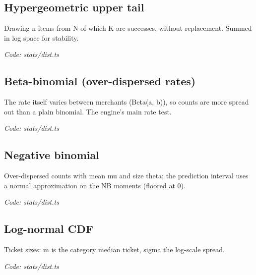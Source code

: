 \documentclass[11pt,a4paper]{article}
\newcommand{\where}[1]{\par{\small\itshape\color{mute}Code: #1}\par}
\begin{document}
\subsection*{Hypergeometric upper tail}
\par\smallskip\noindent{}\par\smallskip
Drawing n items from N of which K are successes, without replacement. Summed in log space for stability.
\where{stats/dist.ts}

\subsection*{Beta-binomial (over-dispersed rates)}
\par\smallskip\noindent{}\par\smallskip
\par\smallskip\noindent{}\par\smallskip
The rate itself varies between merchants (Beta(a, b)), so counts are more spread out than a plain binomial. The engine's main rate test.
\where{stats/dist.ts}

\subsection*{Negative binomial}
\par\smallskip\noindent{}\par\smallskip
\par\smallskip\noindent{}\par\smallskip
Over-dispersed counts with mean mu and size theta; the prediction interval uses a normal approximation on the NB moments (floored at 0).
\where{stats/dist.ts}

\subsection*{Log-normal CDF}
\par\smallskip\noindent{}\par\smallskip
Ticket sizes: m is the category median ticket, sigma the log-scale spread.
\where{stats/dist.ts}
\end{document}
